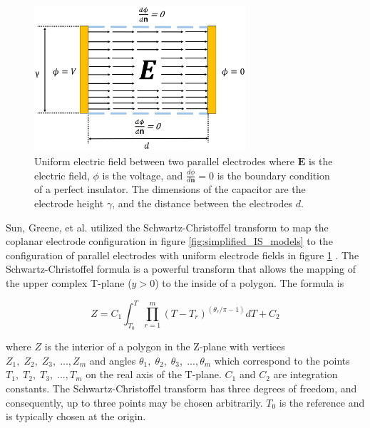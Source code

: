    \begin{figure}[ht]
        \centering
        \includegraphics[width=0.7\textwidth]{images/capacitorNoFringe.png}
        \caption[Uniform electric field between parallel plates]{Uniform electric field between two parallel electrodes where $\boldsymbol{E}$ is the electric field, $\phi$ is the voltage, and $\frac{d\phi}{d\boldsymbol{n}}=0$ is the boundary condition of a perfect insulator. The dimensions of the capacitor are the electrode height $\gamma$, and the distance between the electrodes $d$.}
        \label{fig:parallelCapacitorModel}
  \end{figure}

    \par Sun, Greene, et al. utilized the Schwartz-Christoffel transform to map the coplanar electrode configuration in figure \ref{fig:simplified_IS_models} to the configuration of parallel electrodes with uniform electrode fields in figure \ref{fig:parallelCapacitorModel} \cite{sun_analytical_2007}. The Schwartz-Christoffel formula is a powerful transform that allows the mapping of the upper complex T-plane ($y>0$) to the inside of a polygon. The formula is
    
    \begin{equation}
        Z = C_1 \int_{T_0}^T \prod^m_{r=1} (T - T_r)^{(\theta_r/\pi - 1)} dT + C_2
    \end{equation}
    
    \noindent where $Z$ is the interior of a polygon in the Z-plane with vertices $Z_1,\;Z_2,\;Z_3,\; ...,Z_m$ and angles $\theta_1,\;\theta_2,\;\theta_3,\; ...,\theta_m$ which correspond to the points $T_1,\;T_2,\;T_3,\; ...,T_m$ on the real axis of the T-plane. $C_1$ and $C_2$ are integration constants. The Schwartz-Christoffel transform has three degrees of freedom, and consequently, up to three points may be chosen arbitrarily. $T_0$ is the reference and is typically chosen at the origin.
    
